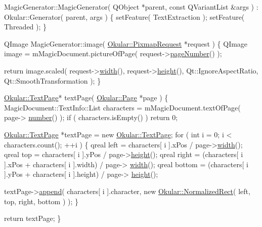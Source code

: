\begin{DoxyCode}
MagicGenerator::MagicGenerator( QObject *parent, \textcolor{keyword}{const} QVariantList &args )
    : Okular::Generator( parent, args )
\{
    setFeature( TextExtraction );
    setFeature( Threaded );
\}

QImage MagicGenerator::image( \hyperlink{classOkular_1_1PixmapRequest}{Okular::PixmapRequest} *request )
\{
    QImage image = mMagicDocument.pictureOfPage( request->\hyperlink{classOkular_1_1PixmapRequest_a50f959175182137dbb9e2dbd6ddd71aa}{pageNumber}() );

    \textcolor{keywordflow}{return} image.scaled( request->\hyperlink{classOkular_1_1PixmapRequest_a3e82f09b91a52efed7435eeb9903e5fc}{width}(), request->\hyperlink{classOkular_1_1PixmapRequest_a782392a2efc6303994c7e0158c76ee06}{height}(), Qt::IgnoreAspectRatio, 
      Qt::SmoothTransformation );
\}

\hyperlink{classOkular_1_1TextPage}{Okular::TextPage}* textPage( \hyperlink{classOkular_1_1Page}{Okular::Page} *page )
\{
    MagicDocument::TextInfo::List characters = mMagicDocument.textOfPage( page->
      \hyperlink{classOkular_1_1Page_a6eee5f157a130b47d81ddd63e501664b}{number}() );
    \textcolor{keywordflow}{if} ( characters.isEmpty() )
        \textcolor{keywordflow}{return} 0;

    \hyperlink{classOkular_1_1TextPage}{Okular::TextPage} *textPage = \textcolor{keyword}{new} \hyperlink{classOkular_1_1TextPage}{Okular::TextPage};
    \textcolor{keywordflow}{for} ( \textcolor{keywordtype}{int} i = 0; i < characters.count(); ++i ) \{
        qreal left = characters[ i ].xPos / page->\hyperlink{classOkular_1_1Page_a57114e88281da2a51b1bb0d5d4996d53}{width}();
        qreal top = characters[ i ].yPos / page->\hyperlink{classOkular_1_1Page_a67246a32b3e625946eb5c685b8372a4f}{height}();
        qreal right = (characters[ i ].xPos + characters[ i ].width) / page->
      \hyperlink{classOkular_1_1Page_a57114e88281da2a51b1bb0d5d4996d53}{width}();
        qreal bottom = (characters[ i ].yPos + characters[ i ].height) / page->
      \hyperlink{classOkular_1_1Page_a67246a32b3e625946eb5c685b8372a4f}{height}();

        textPage->\hyperlink{classOkular_1_1TextPage_a003032e4e1cd8c15f01ed639ce62d11f}{append}( characters[ i ].character,
                          \textcolor{keyword}{new} \hyperlink{classOkular_1_1NormalizedRect}{Okular::NormalizedRect}( left, top, right, bottom ) );
    \}

    \textcolor{keywordflow}{return} textPage;
\}
\end{DoxyCode}


